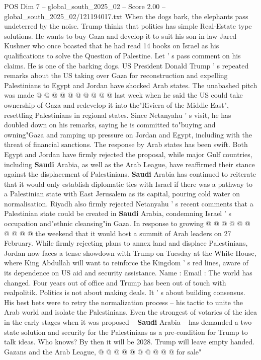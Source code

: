 \begin{textsample}{POS Dim 7 – global\_south\_2025\_02 – Score 2.00 – global\_south\_2025\_02/121194017.txt}
When the dogs bark, the elephants pass undeterred by the noise.
Trump thinks that politics has simple Real-Estate type solutions.
He wants to buy Gaza and develop it to suit his son-in-law Jared Kushner who once boasted that he had read 14 books on Israel as his qualifications to solve the Question of Palestine.
Let ' s pass comment on his claims.
He is one of the barking dogs.
US President Donald Trump ' s repeated remarks about the US taking over Gaza for reconstruction and expelling Palestinians to Egypt and Jordan have shocked Arab states.
The unabashed pitch was made @ @ @ @ @ @ @ @ @ @ last week when he said the US could take ownership of Gaza and redevelop it into the"Riviera of the Middle East", resettling Palestinians in regional states.
Since Netanyahu ' s visit, he has doubled down on his remarks, saying he is committed to"buying and owning"Gaza and ramping up pressure on Jordan and Egypt, including with the threat of financial sanctions.
The response by Arab states has been swift.
Both Egypt and Jordan have firmly rejected the proposal, while major Gulf countries, including \textbf{Saudi} Arabia, as well as the Arab League, have reaffirmed their stance against the displacement of Palestinians. \textbf{Saudi} Arabia has continued to reiterate that it would only establish diplomatic ties with Israel if there was a pathway to a Palestinian state with East Jerusalem as its capital, pouring cold water on normalisation.
Riyadh also firmly rejected Netanyahu ' s recent comments that a Palestinian state could be created in \textbf{Saudi} Arabia, condemning Israel ' s occupation and"ethnic cleansing"in Gaza.
In response to growing @ @ @ @ @ @ @ @ @ @ the weekend that it would host a summit of Arab leaders on 27 February.
While firmly rejecting plans to annex land and displace Palestinians, Jordan now faces a tense showdown with Trump on Tuesday at the White House, where King Abdullah will want to reinforce the Kingdom ' s red lines, aware of its dependence on US aid and security assistance.
Name : Email : The world has changed.
Four years out of office and Trump has been out of touch with realpolitik.
Politics is not about making deals.
It ' s about building consensus.
His best bets were to retry the normalization process -- his tactic to unite the Arab world and isolate the Palestinians.
Even the strongest of votaries of the idea in the early stages when it was proposed -- \textbf{Saudi} Arabia -- has demanded a two-state solution and security for the Palestinians as a pre-condition for Trump to talk ideas.
Who knows?
By then it will be 2028.
Trump will leave empty handed.
Gazans and the Arab League, @ @ @ @ @ @ @ @ @ @ for sale"

\end{textsample}
